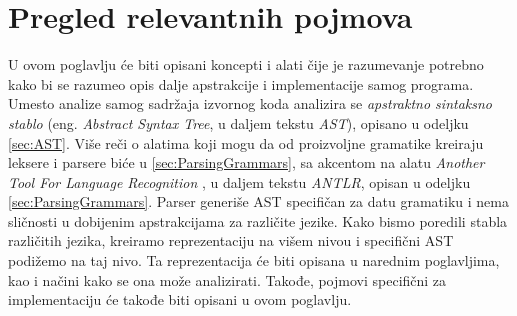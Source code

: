 \chapter{Pregled relevantnih pojmova}
\label{chp:RelevantTerms}

U ovom poglavlju će biti opisani koncepti i alati čije je razumevanje potrebno kako bi se razumeo opis dalje apstrakcije i implementacije samog programa. Umesto analize samog sadržaja izvornog koda analizira se \emph{apstraktno sintaksno stablo} (eng. \emph{Abstract Syntax Tree}, u daljem tekstu \emph{AST}), opisano u odeljku \ref{sec:AST}. Više reči o alatima koji mogu da od proizvoljne gramatike kreiraju leksere i parsere biće u \ref{sec:ParsingGrammars}, sa akcentom na alatu \emph{Another Tool For Language Recognition} \cite{ANTLR}, u daljem tekstu \emph{ANTLR}, opisan u odeljku \ref{sec:ParsingGrammars}. Parser generiše AST specifičan za datu gramatiku i nema sličnosti u dobijenim apstrakcijama za različite jezike. Kako bismo poredili stabla različitih jezika, kreiramo reprezentaciju na višem nivou i specifični AST podižemo na taj nivo. Ta reprezentacija će biti opisana u narednim poglavljima, kao i načini kako se ona može analizirati. Takođe, pojmovi specifični za implementaciju će takođe biti opisani u ovom poglavlju.







